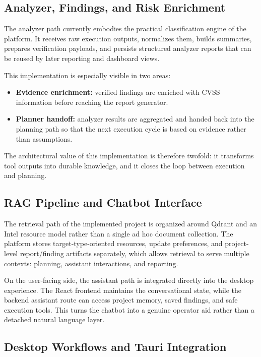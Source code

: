 \documentclass[12pt,a4paper]{report}
\begin{document}
\subsection{Analyzer, Findings, and Risk Enrichment}

The analyzer path currently embodies the practical classification engine of the
platform. It receives raw execution outputs, normalizes them, builds summaries,
prepares verification payloads, and persists structured analyzer reports that can be
reused by later reporting and dashboard views.

This implementation is especially visible in two areas:
\begin{itemize}
    \item \textbf{Evidence enrichment:} verified findings are enriched with CVSS
    information before reaching the report generator.
    \item \textbf{Planner handoff:} analyzer results are aggregated and handed back
    into the planning path so that the next execution cycle is based on evidence
    rather than assumptions.
\end{itemize}

The architectural value of this implementation is therefore twofold: it transforms
tool outputs into durable knowledge, and it closes the loop between execution and
planning.

\subsection{RAG Pipeline and Chatbot Interface}

The retrieval path of the implemented project is organized around Qdrant and an Intel
resource model rather than a single ad hoc document collection. The platform stores
target-type-oriented resources, update preferences, and project-level report/finding
artifacts separately, which allows retrieval to serve multiple contexts: planning,
assistant interactions, and reporting.

On the user-facing side, the assistant path is integrated directly into the desktop
experience. The React frontend maintains the conversational state, while the backend
assistant route can access project memory, saved findings, and safe execution tools.
This turns the chatbot into a genuine operator aid rather than a detached natural
language layer.

\subsection{Desktop Workflows and Tauri Integration}
\end{document}
